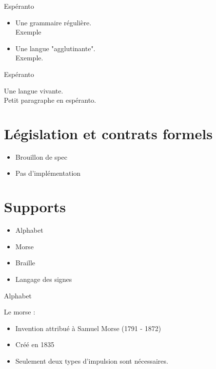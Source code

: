 \documentclass{beamer}
\begin{document}
\begin{frame}
\begin{center}
\huge Espéranto
\end{center}
\begin{itemize}
\item Une grammaire régulière.
\\ Exemple
\item Une langue "agglutinante".
\\ Exemple.
\end{itemize}
\end{frame}

\begin{frame}
\begin{center}
\huge Espéranto
\end{center}
Une langue vivante.
\\ Petit paragraphe en espéranto.
\end{frame}

\section[Contrats]{Législation et contrats formels}

\begin{frame}  
  \begin{itemize}
  \item Brouillon de spec
  \item Pas d'implémentation
  \end{itemize}
\end{frame}

\section{Supports}

\begin{frame}  
  \begin{itemize}
  \item Alphabet %
  \item Morse
  \item Braille
  \item Langage des signes
  \end{itemize}
\end{frame}

\begin{frame}  
  \Huge Alphabet
\end{frame}


\begin{frame}
  \Huge Le morse :
  \normalsize \begin{itemize}
  \item Invention attribué à Samuel Morse (1791 - 1872)
  \item Créé en 1835
  \item Seulement deux types d'impulsion sont nécessaires.
  \end{itemize}
\end{frame}
\end{document}
